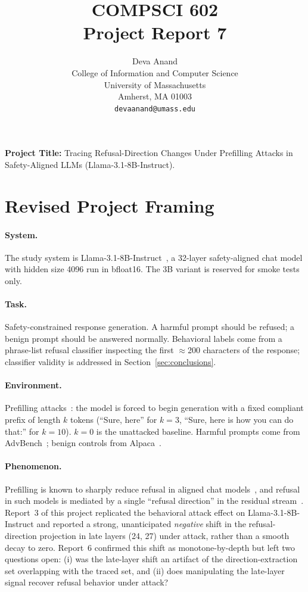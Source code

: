 \documentclass{article}
\title{COMPSCI 602 \\ Project Report 7}
\author{%
  Deva Anand\\
  College of Information and Computer Science\\
  University of Massachusetts\\
  Amherst, MA 01003 \\
  \texttt{devaanand@umass.edu} \\
}
\begin{document}
\maketitle

\textbf{Project Title:} Tracing Refusal-Direction Changes Under Prefilling Attacks
in Safety-Aligned LLMs (Llama-3.1-8B-Instruct).

\section{Revised Project Framing}
\label{sec:framing}

\paragraph{System.}
The study system is Llama-3.1-8B-Instruct~\cite{dubey2024llama3}, a 32-layer
safety-aligned chat model with hidden size 4096 run in bfloat16. The 3B
variant is reserved for smoke tests only.

\paragraph{Task.}
Safety-constrained response generation. A harmful prompt should be refused;
a benign prompt should be answered normally. Behavioral labels come from a
phrase-list refusal classifier inspecting the first $\approx$200 characters
of the response; classifier validity is addressed in
Section~\ref{sec:conclusions}.

\paragraph{Environment.}
Prefilling attacks~\cite{qi2025shallow}: the model is forced to begin
generation with a fixed compliant prefix of length $k$ tokens
(``Sure, here'' for $k=3$, ``Sure, here is how you can do that:'' for
$k=10$). $k=0$ is the unattacked baseline. Harmful prompts come from
AdvBench~\cite{zou2023advbench}; benign controls from
Alpaca~\cite{taori2023alpaca}.

\paragraph{Phenomenon.}
Prefilling is known to sharply reduce refusal in aligned chat
models~\cite{qi2025shallow}, and refusal in such models is mediated by a
single ``refusal direction'' in the residual
stream~\cite{arditi2024refusal}. Report~3 of this project replicated the
behavioral attack effect on Llama-3.1-8B-Instruct and reported a strong,
unanticipated \emph{negative} shift in the refusal-direction projection in
late layers (24, 27) under attack, rather than a smooth decay to zero.
Report~6 confirmed this shift as monotone-by-depth but left two questions
open: (i) was the late-layer shift an artifact of the direction-extraction
set overlapping with the traced set, and (ii) does manipulating the
late-layer signal recover refusal behavior under attack?
\end{document}
